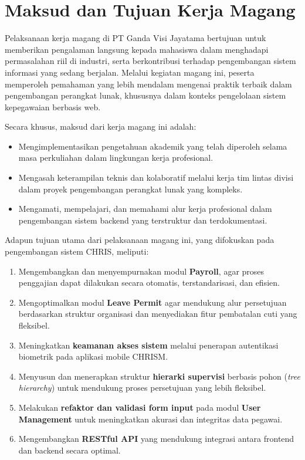 \section{Maksud dan Tujuan Kerja Magang}

Pelaksanaan kerja magang di PT Ganda Visi Jayatama bertujuan untuk memberikan pengalaman langsung kepada mahasiswa dalam menghadapi permasalahan riil di industri, serta berkontribusi terhadap pengembangan sistem informasi yang sedang berjalan. Melalui kegiatan magang ini, peserta memperoleh pemahaman yang lebih mendalam mengenai praktik terbaik dalam pengembangan perangkat lunak, khususnya dalam konteks pengelolaan sistem kepegawaian berbasis web.

Secara khusus, maksud dari kerja magang ini adalah:

\begin{itemize}
    \item Mengimplementasikan pengetahuan akademik yang telah diperoleh selama masa perkuliahan dalam lingkungan kerja profesional.
    \item Mengasah keterampilan teknis dan kolaboratif melalui kerja tim lintas divisi dalam proyek pengembangan perangkat lunak yang kompleks.
    \item Mengamati, mempelajari, dan memahami alur kerja profesional dalam pengembangan sistem backend yang terstruktur dan terdokumentasi.
\end{itemize}

Adapun tujuan utama dari pelaksanaan magang ini, yang difokuskan pada pengembangan sistem CHRIS, meliputi:

\begin{enumerate}
    \item Mengembangkan dan menyempurnakan modul \textbf{Payroll}, agar proses penggajian dapat dilakukan secara otomatis, terstandarisasi, dan efisien.
    \item Mengoptimalkan modul \textbf{Leave Permit} agar mendukung alur persetujuan berdasarkan struktur organisasi dan menyediakan fitur pembatalan cuti yang fleksibel.
    \item Meningkatkan \textbf{keamanan akses sistem} melalui penerapan autentikasi biometrik pada aplikasi mobile CHRISM.
    \item Menyusun dan menerapkan struktur \textbf{hierarki supervisi} berbasis pohon (\textit{tree hierarchy}) untuk mendukung proses persetujuan yang lebih fleksibel.
    \item Melakukan \textbf{refaktor dan validasi form input} pada modul \textbf{User Management} untuk meningkatkan akurasi dan integritas data pegawai.
    \item Mengembangkan \textbf{RESTful API} yang mendukung integrasi antara frontend dan backend secara optimal.
\end{enumerate}

